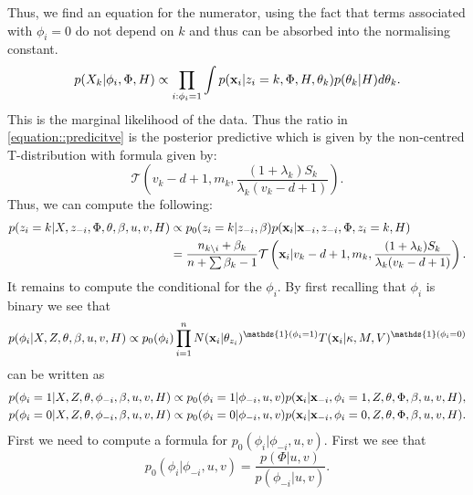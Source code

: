 \documentclass[12pt,english]{article}
\begin{document}
Thus, we find an equation for the numerator, using the fact that terms associated with $\phi_i = 0$ do not depend on $k$ and thus can be absorbed into the normalising constant.
\begin{equation}
\begin{split}
p(X_{k}|\phi_i, \Phi, H) &\propto \prod_{i:\phi_i =1}\int p({\bf x}_i| z_i = k, \Phi, H, \theta_{k})p(\theta_{k}|H) d\theta_{k}.\\
\end{split}
\end{equation}
This is the marginal likelihood of the data. Thus the ratio in \ref{equation::predicitve} is the posterior predictive which is given by the non-centred T-distribution with formula given by:
\[\mathcal{T}\left(v_k - d + 1, m_k,  \frac{(1+\lambda_k)S_k}{\lambda_k (v_k - d + 1)} \right).\]
Thus, we can compute the following:
\begin{equation} \label{equation::alloc2}
\begin{split}
p(z_i = k|X,z_{-i},\Phi, \theta, \beta, u,v, H) & \propto p_0(z_i = k|z_{-i},\beta)p({\bf x}_i|{\bf x}_{-i},z_{-i},\Phi, z_i = k, H)\\
& = \frac{n_{k \backslash i} + \beta_k}{n + \sum \beta_k - 1}\mathcal{T}\left({\bf x}_i|v_k - d + 1, m_k,  \frac{(1+\lambda_k)S_k}{\lambda_k (v_k - d + 1)} \right) .
\end{split}
\end{equation}
It remains to compute the conditional for the $\phi_i$. By first recalling that $\phi_i$ is binary we see that
\begin{equation}
p(\phi_i|X,Z,\theta, \beta, u,v, H) \propto p_0(\phi_i)\prod_{i = 1}^{n}N({\bf x}_i|\theta_{z_i})^{\mathds{1}(\phi_i=1)}T({\bf x}_i|\kappa, M, V)^{\mathds{1}(\phi_i=0)}
\end{equation}
can be written as
\begin{equation}
\begin{split}
p(\phi_i = 1|X,Z,\theta, \phi_{-i}, \beta, u,v, H) &\propto p_0(\phi_i = 1|\phi_{-i},u,v)p({\bf x}_i|{\bf x}_{-i},\phi_i =1,Z,\theta, \Phi, \beta, u,v, H), \\
p(\phi_i = 0|X,Z,\theta,\phi_{-i}, \beta, u,v, H) &\propto p_0(\phi_i = 0|\phi_{-i},u,v)p({\bf x}_i|{\bf x}_{-i},\phi_i=0,Z,\theta, \Phi, \beta, u,v, H). \\
\end{split}
\end{equation}
First we need to compute a formula for  $p_0(\phi_i|\phi_{-i},u,v)$. First we see that
\begin{equation}
p_0(\phi_i|\phi_{-i},u,v) = \frac{p(\Phi|u,v)}{p(\phi_{-i}|u,v)}.
\end{equation}
\end{document}
